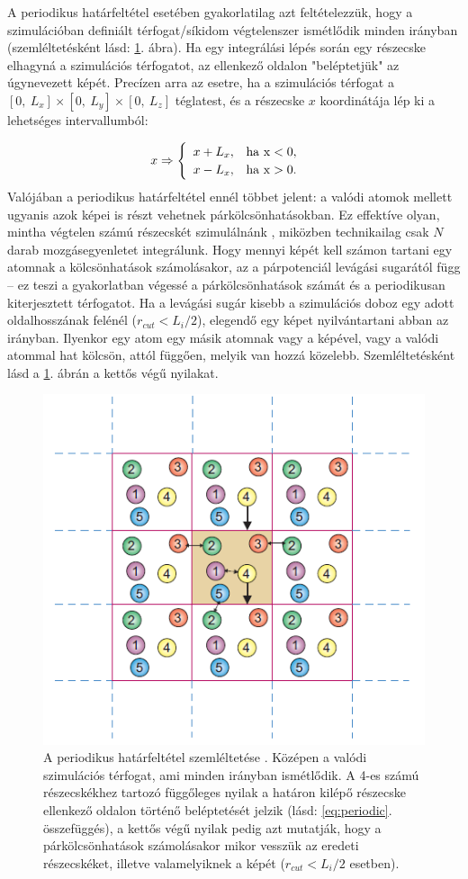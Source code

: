 \documentclass[12pt]{article}
\theoremstyle{plain}
\begin{document}
A periodikus határfeltétel esetében gyakorlatilag azt feltételezzük, hogy a szimulációban definiált térfogat/síkidom végtelenszer ismétlődik minden irányban (szemléltetésként lásd: \ref{fig:periodicboundary}. ábra). Ha egy integrálási lépés során egy részecske elhagyná a szimulációs térfogatot, az ellenkező oldalon "beléptetjük" az úgynevezett képét. Precízen arra az esetre, ha a szimulációs térfogat a $[0, ~L_x] \times [0, ~L_y] \times [0, ~L_z]$ téglatest, és a részecske $x$ koordinátája lép ki a lehetséges intervallumból:

\begin{equation}
	x \Rightarrow \begin{cases}
	\begin{array}{lr}
	x + L_x, & \rm{ha} ~x<0, \\
	x - L_x, & \rm{ha} ~x>0.
	\end{array}
	\end{cases}
	\label{eq:periodic}
\end{equation}
Valójában a periodikus határfeltétel ennél többet jelent: a valódi atomok mellett ugyanis azok képei is részt vehetnek párkölcsönhatásokban. Ez effektíve olyan, mintha végtelen számú részecskét szimulálnánk \cite{Landau2012}, miközben technikailag csak $N$ darab mozgásegyenletet integrálunk. Hogy mennyi képét kell számon tartani egy atomnak a kölcsönhatások számolásakor, az a párpotenciál levágási sugarától függ -- ez teszi a gyakorlatban végessé a párkölcsönhatások számát és a periodikusan kiterjesztett térfogatot. Ha a levágási sugár kisebb a szimulációs doboz egy adott oldalhosszának felénél ($r_{cut} < L_i/2$), elegendő egy képet nyilvántartani abban az irányban. Ilyenkor egy atom egy másik atomnak vagy a képével, vagy a valódi atommal hat kölcsön, attól függően, melyik van hozzá közelebb. Szemléltetésként lásd a \ref{fig:periodicboundary}. ábrán a kettős végű nyilakat. 


\begin{figure}
	\centering
	\includegraphics[width=0.5\linewidth]{media/periodic_boundary}
	\caption{A periodikus határfeltétel szemléltetése \cite{Landau2012}. Középen a valódi szimulációs térfogat, ami minden irányban ismétlődik. A 4-es számú részecskékhez tartozó függőleges nyilak a határon kilépő részecske ellenkező oldalon történő beléptetését jelzik (lásd: \ref{eq:periodic}. összefüggés), a kettős végű nyilak pedig azt mutatják, hogy a párkölcsönhatások számolásakor mikor vesszük az eredeti részecskéket, illetve valamelyiknek a képét ($r_{cut} < L_i/2$ esetben).}
	\label{fig:periodicboundary}
\end{figure}
\end{document}
